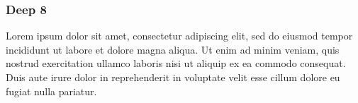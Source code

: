 \documentclass[11pt]{article}
\begin{document}
\subsubsection{Deep 8}
Lorem ipsum dolor sit amet, consectetur adipiscing elit, sed do eiusmod tempor incididunt ut labore et dolore magna aliqua. Ut enim ad minim veniam, quis nostrud exercitation ullamco laboris nisi ut aliquip ex ea commodo consequat. Duis aute irure dolor in reprehenderit in voluptate velit esse cillum dolore eu fugiat nulla pariatur.
\end{document}
